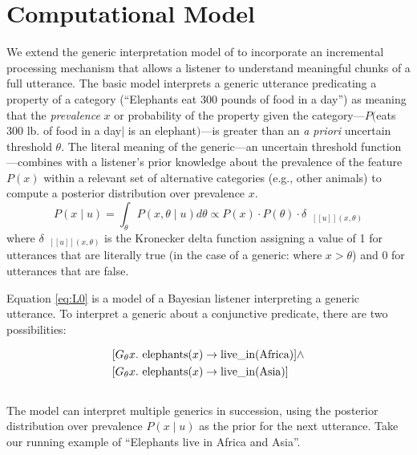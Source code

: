 \documentclass[10pt,letterpaper]{article}
\newcommand{\denote}[1]{\mbox{ $[\![ #1 ]\!]$}}
\begin{document}
\section{Computational Model}

We extend the generic interpretation model of  to incorporate an incremental processing mechanism that allows a listener to understand meaningful chunks of a full utterance.
The basic model interprets a generic utterance predicating a property of a category (``Elephants eat 300 pounds of food in a day'') as meaning that the \emph{prevalence} $x$ or probability of the property given the category---$P($eats 300 lb. of food in a day$\mid$ is an elephant$)$---is greater than an \emph{a priori} uncertain threshold $\theta$.
The literal meaning of the generic---an uncertain threshold function---combines with a listener's prior knowledge about the prevalence of the feature $P(x)$ within a relevant set of alternative categories (e.g., other animals) to compute a posterior distribution over prevalence $x$. 
\begin{equation}
P(x \mid u) = \int_{\theta} P(x, \theta \mid u)  d\theta \propto P(x) \cdot P(\theta) \cdot \delta_{\denote{u}(x, \theta)} 
\label{eq:L0}
\end{equation}
\noindent where $\delta_{\denote{u}(x, \theta)}$ is the Kronecker delta function assigning a value of 1 for utterances that are literally true (in the case of a generic: where $x > \theta$) and 0 for utterances that are false.

Equation \ref{eq:L0} is a model of a Bayesian listener interpreting a generic utterance.
To interpret a generic about a conjunctive predicate, there are two possibilities:

\begin{equation}
\begin{split}
[G_\theta x. \textnormal{ elephants}(x)& \to \textnormal{live\_in}(\textnormal{Africa})] \land \\
[G_\theta x. \textnormal{ elephants}(x)& \to \textnormal{live\_in}(\textnormal{Asia})] 
\end{split}
\label{eq:sem}
\end{equation}

\begin{equation}
[G_\theta x. \textnormal{ elephants}(x) \to \textnormal{live\_in}(\textnormal{Africa} \land \textnormal{Asia})]
\label{eq:sem1}
\end{equation}

The model can interpret multiple generics in succession, using the posterior distribution over prevalence $P(x \mid u)$ as the prior for the next utterance. 
Take our running example of ``Elephants live in Africa and Asia''.
\end{document}
